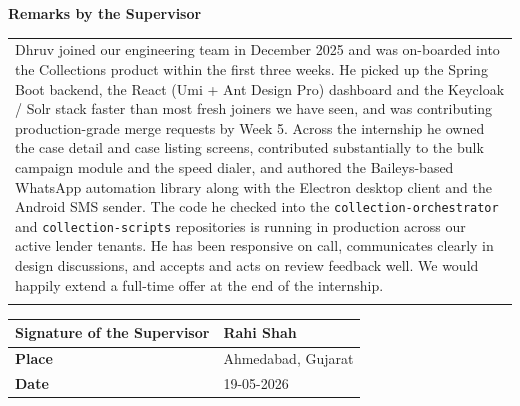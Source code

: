 \documentclass[a4paper,11pt]{article}
\begin{document}
\vspace{0.5cm}

\noindent\textbf{Remarks by the Supervisor}

\vspace{0.2cm}
\begin{tabularx}{\textwidth}{|X|}
\hline
Dhruv joined our engineering team in December 2025 and was on-boarded into the Collections product within the first three weeks. He picked up the Spring Boot backend, the React (Umi + Ant Design Pro) dashboard and the Keycloak / Solr stack faster than most fresh joiners we have seen, and was contributing production-grade merge requests by Week 5. Across the internship he owned the case detail and case listing screens, contributed substantially to the bulk campaign module and the speed dialer, and authored the Baileys-based WhatsApp automation library along with the Electron desktop client and the Android SMS sender. The code he checked into the \texttt{collection-orchestrator} and \texttt{collection-scripts} repositories is running in production across our active lender tenants. He has been responsive on call, communicates clearly in design discussions, and accepts and acts on review feedback well. We would happily extend a full-time offer at the end of the internship.\\
\\
\hline
\end{tabularx}

\vspace{0.8cm}

\begin{tabularx}{\textwidth}{|L{6cm}|X|}
\hline
\textbf{Signature of the Supervisor} & Rahi Shah \\ \hline
\textbf{Place} & Ahmedabad, Gujarat \\ \hline
\textbf{Date} & 19-05-2026 \\ \hline
\end{tabularx}
\end{document}
